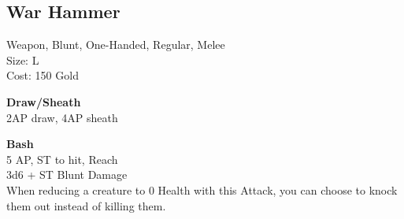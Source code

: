 \subsection{War Hammer}\label{weapon:warHammer}
Weapon, Blunt, One-Handed, Regular, Melee\\
Size: L\\
Cost: 150 Gold

\textbf{Draw/Sheath}\\
2AP draw, 4AP sheath

\textbf{Bash}\\
5 AP, ST to hit,  Reach\\
3d6 + \texttimes ST Blunt Damage\\
When reducing a creature to 0 Health with this Attack, you can choose to knock them out instead of killing them.